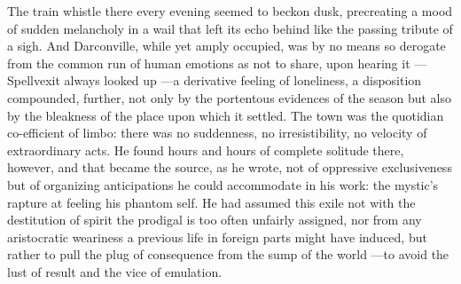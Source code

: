  The train whistle there every evening seemed to beckon
dusk, precreating a mood of sudden melancholy in a wail 
that left its echo behind like the passing tribute of a sigh. And Darconville, 
while yet amply occupied, was by no means so derogate 
from the common run of human emotions as not to share, upon hearing
it ---Spellvexit always looked up ---a derivative feeling of loneliness, a 
disposition
compounded, further, not only by the portentous 
evidences of the season but also
by the bleakness of the place upon which it settled. The town was the quotidian
co-efficient of limbo: 
there was no suddenness, no irresistibility, no velocity
of extraordinary acts. He found hours and hours of complete solitude there,
however, and that became the source, as he wrote, not of oppressive
exclusiveness but of organizing anticipations he could accommodate in his work:
the mystic's rapture 
at feeling his phantom self. He had assumed this exile not
with the destitution of spirit the prodigal 
is too often unfairly assigned, nor
from any aristocratic weariness a previous life in foreign parts might have
induced, but rather to pull the plug of consequence from the sump 
of the world ---to avoid the lust of result and the vice of emulation.

